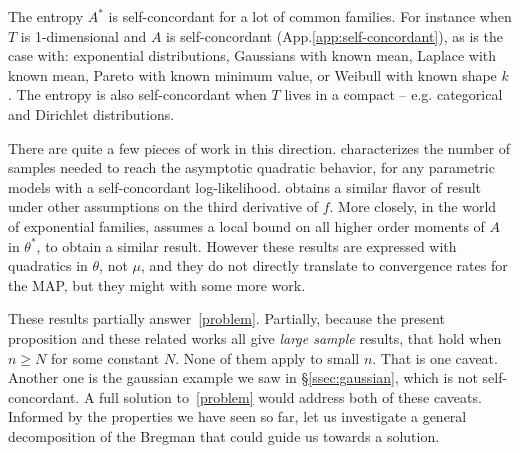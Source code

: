 \documentclass[twoside]{article}
\newcommand{\logpart}{A}
\newcommand{\conj}{\logpart^*}
\newcommand{\nat}{\theta}
\newcommand{\m}{\mu}
\begin{document}
The entropy $\conj$ is self-concordant for a lot of common families.
For instance when $T$ is 1-dimensional and $\logpart$ is self-concordant (App.\ref{app:self-concordant}),
as is the case with:
exponential distributions,
Gaussians with known mean,
Laplace with known mean,
Pareto with known minimum value,
or Weibull with known shape $k$.
The entropy is also self-concordant when $T$ lives in a compact \citep{bubeck2015entropic} -- e.g. categorical and Dirichlet distributions.

There are quite a few pieces of work in this direction.
\citet{ostrovskii2021finite} characterizes the number of samples needed to reach the asymptotic quadratic behavior, for any parametric models with a self-concordant log-likelihood.
\citet{anastasiou2017bounds} obtains a similar flavor of result under other assumptions on the third derivative of $f$.
More closely, in the world of exponential families, \citet{kakade2010learning} assumes a local bound on all higher order moments of $\logpart$ in $\nat^*$, to obtain a similar result.
However these results are expressed with quadratics in $\nat$, not $\m$, and they do not directly translate to convergence rates for the MAP, but they might with some more work.

These results partially answer~\eqref{problem}.
Partially, because the present proposition and these related works all give \textit{large sample} results,  that hold when $n\geq N$ for some constant $N$.
None of them apply to small $n$.
That is one caveat. Another one is the gaussian example we saw in \S\ref{ssec:gaussian}, which is not self-concordant.
A full solution to~\eqref{problem} would address both of these caveats.
Informed by the properties we have seen so far, let us investigate a general decomposition of the Bregman that could guide us towards a solution.
\end{document}
